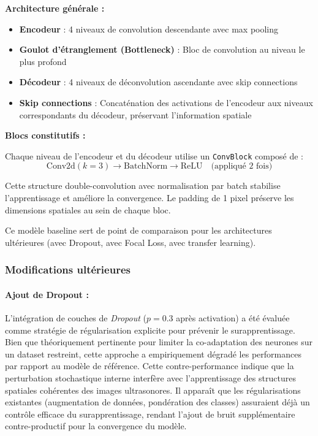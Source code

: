 \textbf{Architecture générale :}

\begin{itemize}
      \item \textbf{Encodeur} : 4 niveaux de convolution descendante avec max pooling
      \item \textbf{Goulot d'étranglement (Bottleneck)} : Bloc de convolution au niveau
            le plus profond
      \item \textbf{Décodeur} : 4 niveaux de déconvolution ascendante avec skip connections
      \item \textbf{Skip connections} : Concaténation des activations de l'encodeur aux
            niveaux correspondants du décodeur, préservant l'information spatiale
\end{itemize}

\textbf{Blocs constitutifs :}

Chaque niveau de l'encodeur et du décodeur utilise un \texttt{ConvBlock} composé de :
\[
      \boxed{\text{Conv2d}(k=3) \to \text{BatchNorm} \to \text{ReLU}} \quad \text{(appliqué 2 fois)}
\]

Cette structure double-convolution avec normalisation par batch stabilise l'apprentissage
et améliore la convergence. Le padding de 1 pixel préserve les dimensions spatiales au sein
de chaque bloc.

Ce modèle baseline sert de point de comparaison pour les architectures ultérieures
(avec Dropout, avec Focal Loss, avec transfer learning).

\subsubsection{Modifications ultérieures}

\paragraph{Ajout de Dropout :}

L'intégration de couches de \textit{Dropout} ($p=0.3$ après activation) a été évaluée comme stratégie de régularisation explicite pour prévenir le surapprentissage. Bien que théoriquement pertinente pour limiter la co-adaptation des neurones sur un dataset restreint, cette approche a empiriquement dégradé les performances par rapport au modèle de référence.
Cette contre-performance indique que la perturbation stochastique interne interfère avec l'apprentissage des structures spatiales cohérentes des images ultrasonores. Il apparaît que les régularisations existantes (augmentation de données, pondération des classes) assuraient déjà un contrôle efficace du surapprentissage, rendant l'ajout de bruit supplémentaire contre-productif pour la convergence du modèle.

